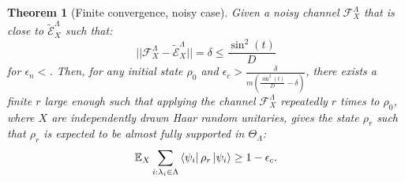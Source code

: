 \documentclass[10pt]{amsart}
\newtheorem{theorem}{Theorem}
\begin{document}
\begin{theorem}[Finite convergence, noisy case]
\label{theorem_finite_convergence_noisy}
Given a noisy channel $\mathcal{F}^{\Lambda}_X$ that is close to $\tilde{\mathcal{E}}^{\Lambda}_X$ such that:
\begin{equation*}
    ||\mathcal{F}^{\Lambda}_X - \tilde{\mathcal{E}}^{\Lambda}_X|| =\delta\leq\frac{\sin^2(t)}{D}
\end{equation*}
for $\epsilon_n<$.
Then, for any initial state $\rho_0$ and $ \epsilon_c>\frac{\delta}{m \left(\frac{\sin^2(t)}{D} - \delta\right)}$, there exists a finite $r$ large enough such that applying the channel $\mathcal{F}^{\Lambda}_X$ repeatedly $r$ times to $\rho_0$, where $X$ are independently drawn Haar random unitaries, gives the state $\rho_{r}$ such that $\rho_{r}$ is expected to be almost fully supported in $\Theta_\Lambda$:
\begin{equation}
\mathbb{E}_X \sum_{i: \lambda_i \in \Lambda} \bra{\psi_i} \rho_{r} \ket{\psi_i} \geq 1 - \epsilon_c.
\end{equation}
\end{theorem}
\end{document}

